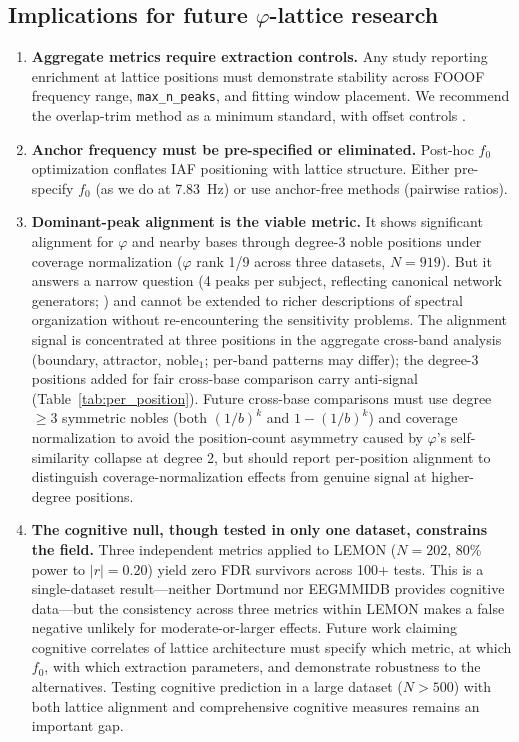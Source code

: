 \documentclass[11pt,a4paper]{article}
\newcommand{\phisym}{\varphi}
\newcommand{\fzero}{f_0}
\begin{document}
\subsection{Implications for future $\phisym$-lattice research}

\begin{enumerate}
    \item \textbf{Aggregate metrics require extraction controls.} Any study reporting enrichment at lattice positions must demonstrate stability across FOOOF frequency range, \texttt{max\_n\_peaks}, and fitting window placement. We recommend the overlap-trim method as a minimum standard, with offset controls \parencite{Donoghue2020, Ostlund2022}.
    \item \textbf{Anchor frequency must be pre-specified or eliminated.} Post-hoc $\fzero$ optimization conflates IAF positioning with lattice structure. Either pre-specify $\fzero$ (as we do at 7.83~Hz) or use anchor-free methods (pairwise ratios).
    \item \textbf{Dominant-peak alignment is the viable metric.} It shows significant alignment for $\phisym$ and nearby bases through degree-3 noble positions under coverage normalization ($\phisym$ rank 1/9 across three datasets, $N = 919$). But it answers a narrow question (4 peaks per subject, reflecting canonical network generators; \cite{Buzsaki2004}) and cannot be extended to richer descriptions of spectral organization without re-encountering the sensitivity problems. The alignment signal is concentrated at three positions in the aggregate cross-band analysis (boundary, attractor, noble$_1$; per-band patterns may differ); the degree-3 positions added for fair cross-base comparison carry anti-signal (Table~\ref{tab:per_position}). Future cross-base comparisons must use degree $\geq 3$ symmetric nobles (both $(1/b)^k$ and $1 - (1/b)^k$) and coverage normalization to avoid the position-count asymmetry caused by $\phisym$'s self-similarity collapse at degree 2, but should report per-position alignment to distinguish coverage-normalization effects from genuine signal at higher-degree positions.
    \item \textbf{The cognitive null, though tested in only one dataset, constrains the field.} Three independent metrics applied to LEMON ($N = 202$, 80\% power to $|r| = 0.20$) yield zero FDR survivors across 100+ tests. This is a single-dataset result---neither Dortmund nor EEGMMIDB provides cognitive data---but the consistency across three metrics within LEMON makes a false negative unlikely for moderate-or-larger effects. Future work claiming cognitive correlates of lattice architecture must specify which metric, at which $\fzero$, with which extraction parameters, and demonstrate robustness to the alternatives. Testing cognitive prediction in a large dataset ($N > 500$) with both lattice alignment and comprehensive cognitive measures remains an important gap.
\end{enumerate}
\end{document}
